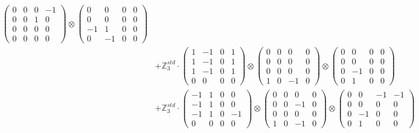 \documentclass{article}
\begin{document}
{\begin{align}
            \begin{pmatrix} 0 & 0 & 0 & -1 \\ 0 & 0 & 1 & 0 \\ 0 & 0 & 0 & 0 \\ 0 & 0 & 0 & 0 \end{pmatrix} \otimes 
            \begin{pmatrix} 0 & 0 & 0 & 0 \\ 0 & 0 & 0 & 0 \\ -1 & 1 & 0 & 0 \\ 0 & -1 & 0 & 0 \end{pmatrix} \\ 
        &+ \label{Rs16-Rc11-Solution-12-c20} \mathbb{Z}_3^{std} \cdot 
            \begin{pmatrix} 1 & -1 & 0 & 1 \\ 1 & -1 & 0 & 1 \\ 1 & -1 & 0 & 1 \\ 0 & 0 & 0 & 0 \end{pmatrix} \otimes 
            \begin{pmatrix} 0 & 0 & 0 & 0 \\ 0 & 0 & 0 & 0 \\ 0 & 0 & 0 & 0 \\ 1 & 0 & -1 & 0 \end{pmatrix} \otimes 
            \begin{pmatrix} 0 & 0 & 0 & 0 \\ 0 & 0 & 0 & 0 \\ 0 & -1 & 0 & 0 \\ 0 & 1 & 0 & 0 \end{pmatrix} \\ 
        &+ \label{Rs16-Rc11-Solution-12-c21} \mathbb{Z}_3^{std} \cdot 
            \begin{pmatrix} -1 & 1 & 0 & 0 \\ -1 & 1 & 0 & 0 \\ -1 & 1 & 0 & -1 \\ 0 & 0 & 0 & 0 \end{pmatrix} \otimes 
            \begin{pmatrix} 0 & 0 & 0 & 0 \\ 0 & 0 & -1 & 0 \\ 0 & 0 & 0 & 0 \\ 1 & 0 & -1 & 0 \end{pmatrix} \otimes 
            \begin{pmatrix} 0 & 0 & -1 & -1 \\ 0 & 0 & 0 & 0 \\ 0 & -1 & 0 & 0 \\ 0 & 1 & 0 & 0 \end{pmatrix} \\ 

\end{align}}
\end{document}
